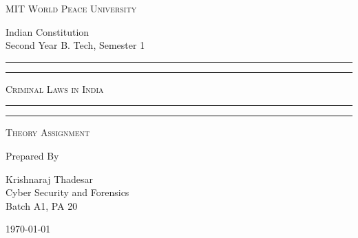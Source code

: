 \documentclass[11pt]{article}
\begin{document}
\begin{titlepage}
	\centering


	\huge\textsc{
		MIT World Peace University
	}\\

	\vspace{0.75\baselineskip} %

	\LARGE{
		Indian Constitution\\
		Second Year B. Tech, Semester 1
	}

	\vfill %


	\rule{\textwidth}{1.6pt}\vspace*{-\baselineskip}\vspace*{2pt}
	\rule{\textwidth}{0.6pt}
	\vspace{0.75\baselineskip} %



	\huge{\textsc{
			Criminal Laws in India
		}} \\



	\vspace{0.5\baselineskip} %
	\rule{\textwidth}{0.6pt}\vspace*{-\baselineskip}\vspace*{2.8pt}
	\rule{\textwidth}{1.6pt}

	\vspace{1\baselineskip} %


	\LARGE\textsc{
		Theory Assignment
	} %
	\vfill


	Prepared By
	\vspace{0.5\baselineskip} %

	\Large{
		Krishnaraj Thadesar \\
		Cyber Security and Forensics\\
		Batch A1, PA 20
	}


	\vspace{0.5\baselineskip} %
	\today

\end{titlepage}
\end{document}
